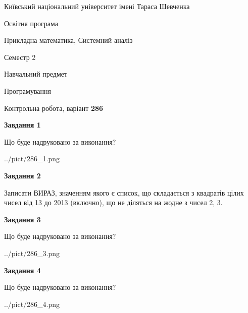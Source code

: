 \documentclass[12pt, ukrainian]{article}
\begin{document}
{{\begin {small}\par
{ \center  Київський національний університет імені Тараса Шевченка \par}
{\parbox {5 cm}{Освітня програма \hfill}{\parbox {8 cm}{Прикладна математика, Системний аналіз \hfill}}\parbox {5 cm}{\hfill Семестр 2}}\par
{\parbox {5 cm} {Навчальний предмет \hfill}\parbox {7 cm}{Програмування \hfill}\parbox {6cm}{\hfill}\par}\vspace{-7pt} \end{small}}{\center Контрольна робота, варіант  \No \textbf
{ 286 }\par}}
{
\begin {large}
{\begin {center}\textbf{Завдання 1}\end {center}}\par
Що буде надруковано за виконання?\par\par
\begin{center}
	{../pict/286_1.png}
\end{center}
\newpage

{\begin {center}\textbf{Завдання 2}\end {center}}\par

Записати ВИРАЗ, значенням якого є список, що складається з квадратів цілих чисел від 13 до 2013 (включно), що не діляться на жодне з чисел 2, 3.\par
\newpage

{\begin {center}\textbf{Завдання 3}\end {center}}\par
Що буде надруковано за виконання?\par
\begin{center}
	{../pict/286_3.png}
\end{center}
\newpage

{\begin {center}\textbf{Завдання 4}\end {center}}\par
Що буде надруковано за виконання?\par
\begin{center}
	{../pict/286_4.png}
\end{center}
\newpage


\end{large}}
\end{document}
